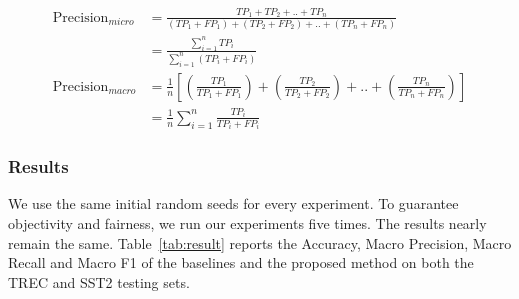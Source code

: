 \documentclass[sn-mathphys,Numbered]{sn-jnl}%
\theoremstyle{thmstyleone}%
\theoremstyle{thmstyletwo}%
\theoremstyle{thmstylethree}%
\begin{document}
\begin{equation}\label{eq:micro-macro-precision}
\begin{aligned}
\text{Precision}_{micro} &= \frac{TP_1 + TP_2 + .. + TP_n}{(TP_1 + FP_1) + (TP_2 + FP_2) + .. + (TP_n + FP_n)} \\
&= \frac{\displaystyle\sum_{i = 1}^n TP_i}{\displaystyle\sum_{i = 1}^n (TP_i + FP_i)} \\
\text{Precision}_{macro} &= \frac{1}{n}\left[\left(\frac{TP_1}{TP_1 + FP_1}\right) + \left(\frac{TP_2}{TP_2 + FP_2}\right) + .. + \left(\frac{TP_n}{TP_n + FP_n}\right)\right] \\
&= \frac{1}{n}\sum_{i = 1}^n \frac{TP_i}{TP_i + FP_i}
\end{aligned}
\end{equation}

\subsubsection{Results}
We use the same initial random seeds for every experiment. To guarantee objectivity and fairness, we run our experiments five times. The results nearly remain the same. Table~\ref{tab:result} reports the Accuracy, Macro Precision, Macro Recall and Macro F1 of the baselines and the proposed method on both the TREC and SST2 testing sets.
\end{document}
